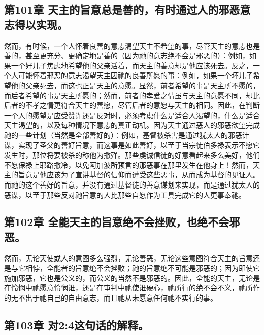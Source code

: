 
\subsection{第101章 天主的旨意总是善的，有时通过人的邪恶意志得以实现。}

然而，有时候，一个人怀着良善的意志渴望天主不希望的事，尽管天主的意志也是善的，甚至更充分、更确定地是善的（因为祂的意志绝不会是邪恶的）：例如，如果一个好儿子焦虑地希望他的父亲活着，而天主的善意却是他应该死去。反之，一个人可能怀着邪恶的意志渴望天主因祂的良善所愿的事：例如，如果一个坏儿子希望他的父亲死去，而这也正是天主的意愿。显然，前者希望的事是天主所不愿的，而后者希望的事是天主所愿的；然而，前者的孝爱之情虽与天主的意愿不同，却比后者的不孝之情更符合天主的善愿，尽管后者的意愿与天主的相同。因此，在判断一个人的愿望是应受赞许还是反对时，必须考虑什么是适合人渴望的，什么是适合天主渴望的，以及每种情况下意志的真正动机。因为天主通过恶人的邪恶欲望完成祂的一些计划（当然是全部善好的）：例如，基督被杀害是通过犹太人的邪恶计谋，实现了圣父的善好旨意，而这事是如此善好，以至于当宗徒伯多禄表示不愿它发生时，那位将要被杀的称他为撒殚。那些虔诚信徒的好意看起来多么美好，他们不愿保禄上耶路撒冷，以免阿加波所预言的那恶事在那里发生在他身上！然而，天主的旨意是他应该为了宣讲基督的信仰而遭受这些恶事，从而成为基督的见证人。而祂的这个善好的旨意，并没有通过基督徒的善意谋划来实现，而是通过犹太人的恶谋，以至于那些反对祂旨意的人比那些自愿作为工具完成它的人更事奉祂。\par


\subsection{第102章 全能天主的旨意绝不会挫败，也绝不会邪恶。}

然而，无论天使或人的意图多么强烈，无论善恶，无论这些意图符合天主的旨意还是与它相悖，全能者的旨意绝不会挫败；祂的旨意绝不可能是邪恶的；因为即使它施加邪恶，它也是公义的，而公义的当然不是邪恶的。因此，全能的天主，无论是在怜悯中祂愿意怜悯谁，还是在审判中祂使谁硬心，祂所行的绝不会不义，祂所作的无不出于祂自己的自由意志，而且祂从未愿意任何祂不实行的事。\par


\subsection{第103章 对2:4这句话的解释。}

